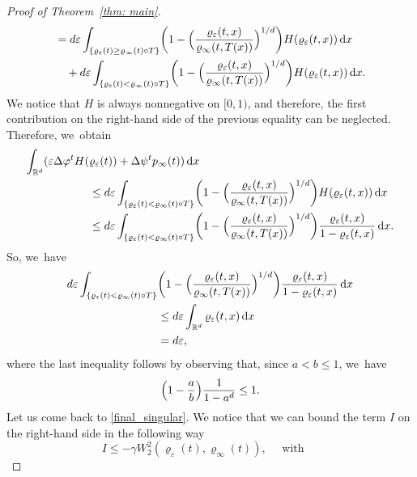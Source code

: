 \documentclass[JEP,XML,SOM,Unicode,published]{cedram}
\newcommand{\Bprt}[1]{\Bigl(#1\Bigr)}
\newcommand{\bbprt}[1]{\biggl(#1\biggr)}
\newcommand{\dx}[1]{\mathop{}\!\mathrm{d} #1}
\newcommand{\R}{\mathbb{R}}
\theoremstyle{plain}
\theoremstyle{remark}
\begin{document}
\begin{proof}[Proof of Theorem~\ref{thm: main}]
\begin{equation*}
\begin{split}
&= {d \varepsilon \int_{\{\varrho_\varepsilon(t) \geq \varrho_\infty(t)\circ T\}} \bbprt{1-\Bprt{\frac{\varrho_\varepsilon(t,x)}{\varrho_\infty(t,T(x))}}^{1/d}} H(\varrho_\varepsilon(t,x)) \dx x}\\
&\quad
+ {d \varepsilon \int_{\{\varrho_\varepsilon(t) < \varrho_\infty(t)\circ T\}} \bbprt{1-\Bprt{\frac{\varrho_\varepsilon(t,x)}{\varrho_\infty(t,T(x))}}^{1/d}} H(\varrho_\varepsilon(t,x)) \dx x}.
\end{split}
\end{equation*}
We notice that $H$ is always nonnegative on $[0,1)$, and therefore, the first contribution on the right-hand side of the previous equality can be neglected. Therefore, we~obtain
\begin{equation*}
\begin{split}
\int_{\R^d} (\varepsilon \Delta \varphi^t H(&\varrho_\varepsilon(t)) +\Delta \psi^t p_\infty(t) )\dx x
\\
&\le {d \varepsilon \int_{\{\varrho_\varepsilon(t) < \varrho_\infty(t)\circ T\}} \bbprt{1-\Bprt{\frac{\varrho_\varepsilon(t,x)}{\varrho_\infty(t,T(x))}}^{1/d}} H(\varrho_\varepsilon(t,x)) \dx x}\\
&\leq d \varepsilon \int_{{\{\varrho_\varepsilon(t) < \varrho_\infty(t)\circ T\}}} \bbprt{1-\Bprt{\frac{\varrho_\varepsilon(t,x)}{\varrho_\infty(t,T(x))}}^{1/d}} \frac{\varrho_\varepsilon(t,x)}{1-\varrho_\varepsilon(t,x)} \dx x.
\end{split}
\end{equation*}
So, we~have
\begin{equation}
\label{singular terms}
\begin{split}
d \varepsilon \int_{{\{\varrho_\varepsilon(t) < \varrho_\infty(t)\circ T\}}} & \bbprt{1-\Bprt{\frac{\varrho_\varepsilon(t,x)}{\varrho_\infty(t,T(x))}}^{1/d}} \frac{\varrho_\varepsilon(t,x)}{1-\varrho_\varepsilon(t,x)} \dx x\\
&\le d \varepsilon \int_{\R^d} \varrho_\varepsilon(t,x) \dx x\\
&= d \varepsilon,
\end{split}
\end{equation}
where the last inequality follows by observing that, since $a<b\leq 1$, we~have
\[
\Bigl(1-\frac ab\Bigr)\frac{1}{1-a^d}\leq 1.
\]
Let us come back to \eqref{final_singular}.
We notice that we can bound the term $I$ on the right-hand side in the following way
\begin{equation*}
I\leq -\gamma W_2^2(\varrho_\varepsilon(t),\varrho_\infty(t)), \quad
\text{ with } \quad

\end{equation*}
\end{proof}
\end{document}
